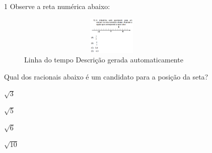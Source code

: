 \begin{escolha}
\begin{boxmedio}
\begin{boxmedio}
{\begin{boxpeq}
\begin{boxpeq}
{\begin{boxpeq}
\begin{boxmedio}
\begin{boxmedio}
\begin{boxpeq}
\begin{boxmedio}
\begin{boxpeq}
\begin{boxpeq}
\begin{boxpeq}
\begin{boxpeq}
\begin{boxmedio}
{\begin{boxmedio}
\begin{boxmedio}
\begin{boxpeq}
\begin{boxmedio}
\begin{boxpeq}
\begin{boxpeq}
\begin{boxpeq}
\begin{escolha}
{\begin{boxmedio}
\begin{boxpeq}
\begin{boxpeq}
\begin{boxpeq}
\begin{boxpeq}
\begin{boxpeq}
\begin{boxmedio}
\begin{boxpeq}
\begin{boxpeq}
\begin{boxpeq}
{\begin{boxpeq}
\begin{boxmedio}
\begin{boxpeq}
\begin{boxpeq}
\begin{boxpeq}
{\begin{boxpeq}
\begin{boxmedio}
{\begin{boxpeq}
\begin{boxpeq}
\begin{boxmedio}
\begin{boxmedio}
\begin{boxpeq}
\begin{boxpeq}
{\begin{boxpeq}
\begin{boxpeq}
\begin{boxpeq}
\begin{boxpeq}
\begin{boxpeq}
\begin{escolha}
\begin{escolha}
{\begin{boxmedio}
\begin{boxpeq}
\begin{q°}
\begin{boxmedio}
\begin{boxpeq}
\begin{boxpeq}
\begin{boxmedio}
\begin{boxmedio}
\begin{boxmedio}
\begin{boxmedio}
\num{1} Observe a reta numérica abaixo:

\begin{figure}
\centering
\includegraphics[width=3.60725in,height=0.70833in]{./_SAEB_9_MAT/media/image250.png}
\caption{Linha do tempo Descrição gerada automaticamente}
\end{figure}


Qual dos racionais abaixo é um candidato para a posição da seta?


\begin{escolha}

  \item $\sqrt{3}$

  \item $\sqrt{5}$

  \item $\sqrt{6}$

  \item $\sqrt{10}$


\end{escolha}


\end{boxmedio}
\end{boxmedio}
\end{boxmedio}
\end{boxmedio}
\end{boxpeq}
\end{boxpeq}
\end{boxmedio}
\end{q°}
\end{boxpeq}
\end{boxmedio}}
\end{escolha}
\end{escolha}
\end{boxpeq}
\end{boxpeq}
\end{boxpeq}
\end{boxpeq}
\end{boxpeq}}
\end{boxpeq}
\end{boxpeq}
\end{boxmedio}
\end{boxmedio}
\end{boxpeq}
\end{boxpeq}}
\end{boxmedio}
\end{boxpeq}}
\end{boxpeq}
\end{boxpeq}
\end{boxpeq}
\end{boxmedio}
\end{boxpeq}}
\end{boxpeq}
\end{boxpeq}
\end{boxpeq}
\end{boxmedio}
\end{boxpeq}
\end{boxpeq}
\end{boxpeq}
\end{boxpeq}
\end{boxpeq}
\end{boxmedio}}
\end{escolha}
\end{boxpeq}
\end{boxpeq}
\end{boxpeq}
\end{boxmedio}
\end{boxpeq}
\end{boxmedio}
\end{boxmedio}}
\end{boxmedio}
\end{boxpeq}
\end{boxpeq}
\end{boxpeq}
\end{boxpeq}
\end{boxmedio}
\end{boxpeq}
\end{boxmedio}
\end{boxmedio}
\end{boxpeq}}
\end{boxpeq}
\end{boxpeq}}
\end{boxmedio}
\end{boxmedio}
\end{escolha}
